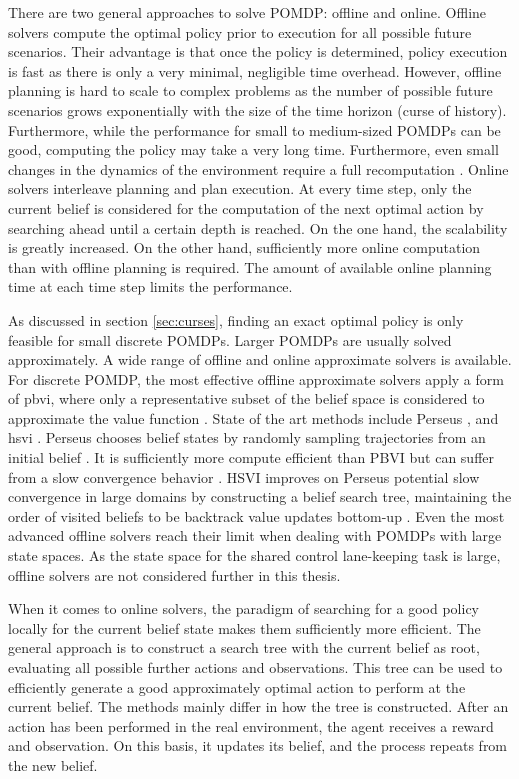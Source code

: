 \noindent
There are two general approaches to solve POMDP: offline and online. Offline solvers compute the optimal policy prior to execution for all possible future scenarios. Their advantage is that once the policy is determined, policy execution is fast as there is only a very minimal, negligible time overhead. However, offline planning is hard to scale to complex problems as the number of possible future scenarios grows exponentially with the size of the time horizon (curse of history). Furthermore, while the performance for small to medium-sized POMDPs can be good, computing the policy may take a very long time. Furthermore, even small changes in the dynamics of the environment require a full recomputation \parencite{online_pomdp}. Online solvers interleave planning and plan execution. At every time step, only the current belief is considered for the computation of the next optimal action by searching ahead until a certain depth is reached. On the one hand, the scalability is greatly increased. On the other hand, sufficiently more online computation than with offline planning is required. The amount of available online planning time at each time step limits the performance. 

As discussed in section \ref{sec:curses}, finding an exact optimal policy is only feasible for small discrete POMDPs. Larger POMDPs are usually solved approximately. A wide range of offline and online approximate solvers is available. For discrete POMDP, the most effective offline approximate solvers apply a form of \gls{pbvi}, where only a representative subset of the belief space is considered to approximate the value function \parencite{pomdp-point-based-value}. State of the art methods include Perseus \parencite{pomdp_perseus}, and \gls{hsvi} \parencite{solver_hsvi}. Perseus chooses belief states by randomly sampling trajectories from an initial belief \parencite{pomdp_perseus}. It is sufficiently more compute efficient than PBVI but can suffer from a slow convergence behavior \parencite{pbvi-survey}. HSVI improves on Perseus potential slow convergence in large domains by constructing a belief search tree, maintaining the order of visited beliefs to be backtrack value updates bottom-up \parencite{solver_hsvi}. Even the most advanced offline solvers reach their limit when dealing with POMDPs with large state spaces. As the state space for the shared control lane-keeping task is large, offline solvers are not considered further in this thesis. 

When it comes to online solvers, the paradigm of searching for a good policy locally for the current belief state makes them sufficiently more efficient. The general approach is to construct a search tree with the current belief as root, evaluating all possible further actions and observations. This tree can be used to efficiently generate a good approximately optimal action to perform at the current belief. The methods mainly differ in how the tree is constructed. After an action has been performed in the real environment, the agent receives a reward and observation. On this basis, it updates its belief, and the process repeats from the new belief. 

